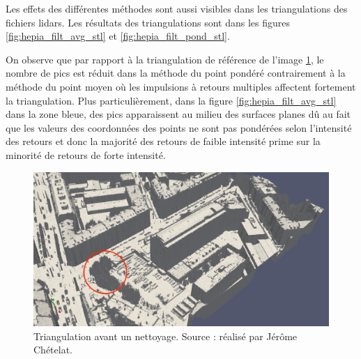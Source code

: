 \newpage


Les effets des différentes méthodes sont aussi visibles dans les triangulations
des fichiers lidars. Les résultats des triangulations sont dans les figures
\ref{fig:hepia_filt_avg_stl} et \ref{fig:hepia_filt_pond_stl}.

On observe que par rapport à la triangulation de référence de l'image \ref{fig:hepia_no_filt_stl},
le nombre de pics est réduit dans la méthode du point pondéré contrairement
à la méthode du point moyen où les impulsions à retours multiples affectent
fortement la triangulation. Plus particulièrement, dans la figure
\ref{fig:hepia_filt_avg_stl} dans la zone bleue, des pics apparaissent au milieu des surfaces planes
dû au fait que les valeurs des coordonnées des points ne sont pas pondérées
selon l'intensité des retours et donc la majorité des retours de
faible intensité prime sur la minorité de retours de forte intensité. 


\begin{figure}[htbp!]
    \centering
	\includegraphics[width=0.9\linewidth]{figures/filters/hepia_stl.png}
	\caption{Triangulation avant un nettoyage. Source : réalisé par Jérôme Chételat.}
	\label{fig:hepia_no_filt_stl}
\end{figure}

